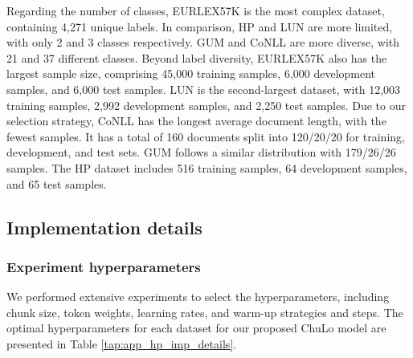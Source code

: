 \documentclass[11pt]{article}
\begin{document}
Regarding the number of classes, EURLEX57K is the most complex dataset, containing 4,271 unique labels. In comparison, HP and LUN are more limited, with only 2 and 3 classes respectively. GUM and CoNLL are more diverse, with 21 and 37 different classes. Beyond label diversity, EURLEX57K also has the largest sample size, comprising 45,000 training samples, 6,000 development samples, and 6,000 test samples. LUN is the second-largest dataset, with 12,003 training samples, 2,992 development samples, and 2,250 test samples. Due to our selection strategy, CoNLL has the longest average document length, with the fewest samples. It has a total of 160 documents split into 120/20/20 for training, development, and test sets. GUM follows a similar distribution with 179/26/26 samples. The HP dataset includes 516 training samples, 64 development samples, and 65 test samples.

\subsection{Implementation details}
\label{app:imp. details}

\subsubsection{Experiment hyperparameters}
 We performed extensive experiments to select the hyperparameters, including chunk size, token weights, learning rates, and warm-up strategies and steps. The optimal hyperparameters for each dataset for our proposed ChuLo model are presented in Table \ref{tap:app_hp_imp_details}. 
\end{document}

